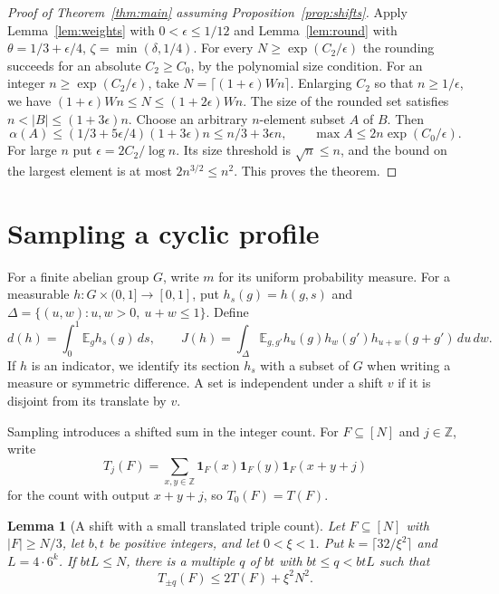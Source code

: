 \documentclass[11pt,reqno]{amsart}
\newtheorem{lemma}[theorem]{Lemma}
\newcommand{\Z}{\mathbb Z}
\newcommand{\E}{\mathbb E}
\newcommand{\ind}{\mathbf 1}
\numberwithin{equation}{section}
\begin{document}
\begin{proof}[Proof of Theorem~\ref{thm:main} assuming Proposition~\ref{prop:shifts}]
Apply Lemma~\ref{lem:weights} with \(0<\epsilon\le1/12\) and
Lemma~\ref{lem:round} with
\(\theta=1/3+\epsilon/4\), \(\zeta=\min(\delta,1/4)\).
For every \(N\ge\exp(C_2/\epsilon)\) the rounding succeeds for an
absolute \(C_2\ge C_0\), by the polynomial size condition.
For an integer \(n\ge\exp(C_2/\epsilon)\), take
\(N=\lceil(1+\epsilon)Wn\rceil\). Enlarging \(C_2\) so that
\(n\ge1/\epsilon\), we have
\((1+\epsilon)Wn\le N\le(1+2\epsilon)Wn\).
The size of the rounded set satisfies \(n<|B|\le(1+3\epsilon)n\).
Choose an arbitrary \(n\)-element subset \(A\) of \(B\). Then
\[
 \alpha(A)\le(1/3+5\epsilon/4)(1+3\epsilon)n
             \le n/3+3\epsilon n,\qquad
 \max A\le 2n\exp(C_0/\epsilon).
\]
For large \(n\) put \(\epsilon=2C_2/\log n\). Its size threshold
is \(\sqrt n\le n\), and the bound on the largest element is
at most \(2n^{3/2}\le n^2\). This proves the theorem.
\end{proof}

\section{Sampling a cyclic profile}\label{sec:sampling}

For a finite abelian group \(G\), write \(m\) for its uniform
probability measure. For a measurable \(h:G\times(0,1]\to[0,1]\),
put \(h_s(g)=h(g,s)\) and \(\Delta=\{(u,w): u,w>0,\ u+w\le1\}\).
Define
\[
 d(h)=\int_0^1\E_g h_s(g)\,ds,\qquad
 J(h)=\int_\Delta \E_{g,g'}h_u(g)h_w(g')h_{u+w}(g+g')\,du\,dw .
\]
If \(h\) is an indicator, we identify its section \(h_s\) with a
subset of \(G\) when writing a measure or symmetric difference.
A set is independent under a shift \(v\) if it is disjoint from its
translate by \(v\).

Sampling introduces a shifted sum in the integer count. For
\(F\subseteq[N]\) and \(j\in\Z\), write
\[
 T_j(F)=\sum_{x,y\in\Z}\ind_F(x)\ind_F(y)\ind_F(x+y+j)
\]
for the count with output \(x+y+j\), so \(T_0(F)=T(F)\).

\begin{lemma}[A shift with a small translated triple count]\label{lem:return}
Let \(F\subseteq[N]\) with \(|F|\ge N/3\), let \(b,t\) be positive
integers, and let \(0<\xi<1\). Put
\(k=\lceil32/\xi^2\rceil\) and \(L=4\cdot6^k\).
If \(btL\le N\), there is a multiple \(q\) of \(bt\) with \(bt\le q<btL\)
such that
\[
 T_{\pm q}(F)\le 2T(F)+\xi^2N^2.
\]
\end{lemma}
\end{document}
